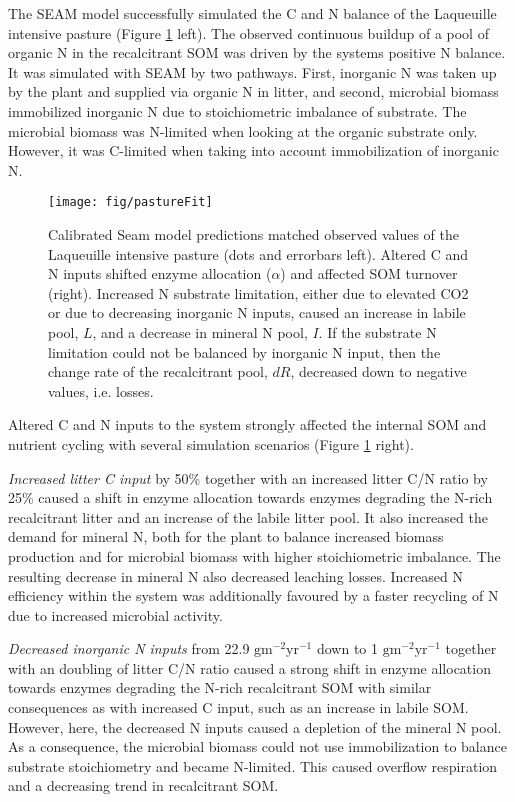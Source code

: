 The SEAM model successfully simulated the C and N balance of the Laqueuille
intensive pasture (Figure \ref{fig:pastureFit} left). The observed continuous
buildup of a pool of organic N in the recalcitrant SOM was driven by the systems
positive N balance. It was simulated with SEAM by two pathways. First, inorganic
N was taken up by the plant and supplied via organic N in litter, and second,
microbial biomass immobilized inorganic N due to stoichiometric imbalance of
substrate. The microbial biomass was N-limited when looking at the organic
substrate only. However, it was C-limited when taking into account
immobilization of inorganic N.

\begin{figure}[t] \vspace*{2mm}
\begin{center}
\texttt{[image: fig/pastureFit]} 
\end{center}
\caption{
Calibrated Seam model predictions matched observed values of the Laqueuille
intensive pasture (dots and errorbars left). Altered C and N inputs shifted
enzyme allocation ($\alpha$) and affected SOM turnover (right).
Increased N substrate limitation, either due to elevated CO2 or due to
decreasing inorganic N inputs, caused an increase in labile pool, $L$, and a
decrease in mineral N pool, $I$. If the substrate N limitation could not be
balanced by inorganic N input, then the change rate of the recalcitrant pool,
$dR$, decreased down to negative values, i.e. losses.
\label{fig:pastureFit}
}
\end{figure}   

Altered C and N inputs to the system strongly affected the internal SOM and
nutrient cycling with several simulation scenarios (Figure \ref{fig:pastureFit}
right).

\textit{Increased litter C input} by 50\% together with an increased litter C/N
ratio by 25\% caused a shift in enzyme allocation towards enzymes degrading the
N-rich recalcitrant litter and an increase of the labile litter pool. It also
increased the demand for mineral N, both for the plant to balance increased
biomass production and for microbial biomass with higher stoichiometric
imbalance. The resulting decrease in mineral N also decreased leaching losses.
Increased N efficiency within the system was additionally favoured by a faster
recycling of N due to increased microbial activity.

\textit{Decreased inorganic N inputs} from 22.9
${\textrm{gm}^{-2}\textrm{yr}^{-1}}$ down to 1
${\textrm{gm}^{-2}\textrm{yr}^{-1}}$ together with an doubling of litter C/N
ratio caused a strong shift in enzyme allocation towards enzymes degrading the
N-rich recalcitrant SOM with similar consequences as with increased C input,
such as an increase in labile SOM. However, here, the decreased N inputs caused
a depletion of the mineral N pool.
As a consequence, the microbial biomass could not use immobilization to
balance substrate stoichiometry and became N-limited.
This caused overflow respiration and a decreasing trend in recalcitrant SOM.

